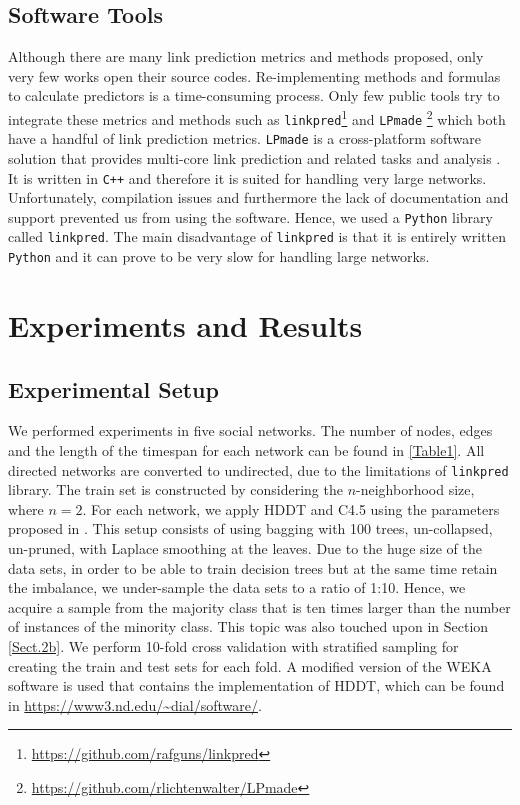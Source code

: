 \documentclass{acm_proc_article-sp}
\begin{document}
\subsection{Software Tools}
Although there are many link prediction metrics and methods proposed, only very few works open their source codes. Re-implementing methods and formulas to calculate predictors is a time-consuming process. Only few public tools try to integrate these metrics and methods such as \texttt{linkpred}\footnote{\url{https://github.com/rafguns/linkpred}} and \texttt{LPmade} \footnote{\url{https://github.com/rlichtenwalter/LPmade}} \cite{lichtenwalter2011lpmade} which both have a handful of link prediction metrics. \texttt{LPmade} is a cross-platform software solution that provides multi-core link prediction and related tasks and analysis \cite{lichtenwalter2011lpmade}. It is written in \texttt{C++} and therefore it is suited for handling very large networks. Unfortunately, compilation issues and furthermore the lack of documentation and support prevented us from using the software. Hence, we used a \texttt{Python} library called \texttt{linkpred}. The main disadvantage of \texttt{linkpred} is that it is entirely written \texttt{Python} and it can prove to be very slow for handling large networks.

\section{Experiments and Results}

\subsection{Experimental Setup}
We performed experiments in five social networks. The number of nodes, edges and the length of the timespan for each network can be found in \autoref{Table1}. All directed networks are converted to undirected, due to the limitations of \texttt{linkpred} library. The train set is constructed by considering the $n$-neighborhood size, where $n = 2$. For each network, we apply HDDT and C4.5 using the parameters proposed in \cite{Cieslak2012}. This setup consists of using bagging with 100 trees, un-collapsed, un-pruned, with Laplace smoothing at the leaves. Due to the huge size of the data sets, in order to be able to train decision trees but at the same time retain the imbalance, we under-sample the data sets to a ratio of 1:10. Hence, we acquire a sample from the majority class that is ten times larger than the number of instances of the minority class. This topic was also touched upon in Section \ref{Sect.2b}. We perform 10-fold cross validation with stratified sampling for creating the train and test sets for each fold. A modified version of the WEKA software \cite{witten2016data} is used that contains the implementation of HDDT, which can be found in \url{https://www3.nd.edu/~dial/software/}. 
\end{document}

